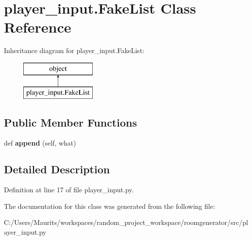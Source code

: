 \hypertarget{classplayer__input_1_1_fake_list}{}\section{player\+\_\+input.\+Fake\+List Class Reference}
\label{classplayer__input_1_1_fake_list}
Inheritance diagram for player\+\_\+input.\+Fake\+List\+:\begin{figure}[H]
\begin{center}
\leavevmode
\includegraphics[height=2.000000cm]{classplayer__input_1_1_fake_list}
\end{center}
\end{figure}
\subsection*{Public Member Functions}
\begin{DoxyCompactItemize}
\item 
\hypertarget{classplayer__input_1_1_fake_list_ade57bb284f7202aad2e574871f1f74c2}{}def {\bfseries append} (self, what)\label{classplayer__input_1_1_fake_list_ade57bb284f7202aad2e574871f1f74c2}

\end{DoxyCompactItemize}


\subsection{Detailed Description}


Definition at line 17 of file player\+\_\+input.\+py.



The documentation for this class was generated from the following file\+:\begin{DoxyCompactItemize}
\item 
C\+:/\+Users/\+Maurits/workspaces/random\+\_\+project\+\_\+workspace/roomgenerator/src/player\+\_\+input.\+py\end{DoxyCompactItemize}
